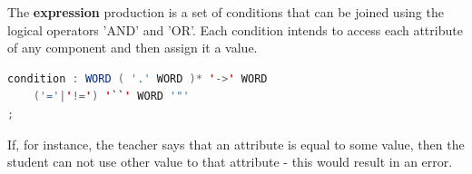 %


The \textbf{expression} production is a set of conditions that can be joined using the logical operators 'AND' and 'OR'. Each condition intends to access each attribute of any component and then assign it a value.

\begin{center}
\begin{minipage}{10cm}
\begin{lstlisting}[language=java, basicstyle=\small, label={lst:dsl_cond_prod}, caption=DSL condition production]
condition : WORD ( '.' WORD )* '->' WORD 
    ('='|'!=') '``' WORD '"'
;
\end{lstlisting}
\end{minipage}
\end{center}



If, for instance, the teacher says that an attribute is equal to some value, then the student can not use other value to that attribute - this would result in an error.

